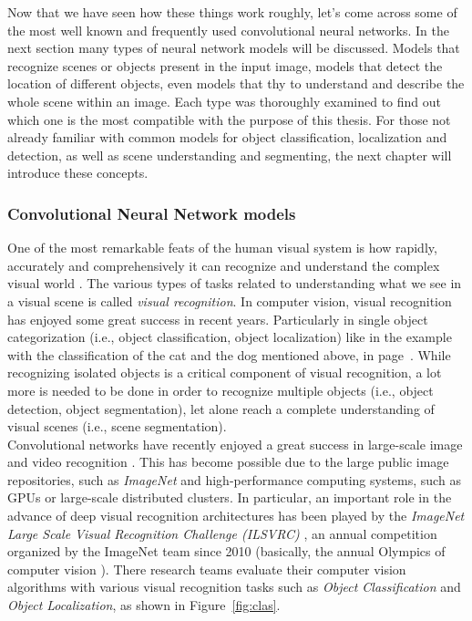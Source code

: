 \documentclass[12pt,a4paper,table,dvipsnames,tikz]{report}
\newcommand{\term}{\textit}
\newcommand{\acronym}{\MakeUppercase}
\newcommand{\bl}[1]{{\hypersetup{linkcolor=blue}#1}}
\begin{document}
	Now that we have seen how these things work roughly, let's come across some of 
	the most well known and frequently used convolutional neural networks. In the 
	next section many types of neural network models will be discussed. Models that 
	recognize scenes or objects present in the input image, models that detect the 
	location of different objects, even models that thy to understand and describe 
	the whole scene within an image. Each type was thoroughly examined to find out 
	which one is the most compatible with the purpose of this thesis. For those 
	not already familiar with common models for object classification, localization 
	and detection, as well as scene understanding and segmenting, the next chapter 
	will introduce these concepts.
	\\
	
	
	\subsubsection{Convolutional Neural Network models}
	\label{sec:bg:data:neural:models}
	
	One of the most remarkable feats of the human visual system is how rapidly, 
	accurately and comprehensively it can recognize and understand the complex visual 
	world \citep{Socher}. The various types of tasks related to understanding what 
	we see in a visual scene is called \term{visual recognition}. In computer vision, 
	visual recognition has enjoyed some great success in recent years. Particularly 
	in single object categorization (i.e., object classification, object localization) 
	like in the example with the classification of the cat and the dog mentioned above, 
	in page~\pageref{eg:cat_dog}. 
	While recognizing isolated objects is a critical component of visual recognition, 
	a lot more is needed to be done in order to recognize multiple objects (i.e., 
	object detection, object segmentation), let alone reach a complete understanding 
	of visual scenes (i.e., scene segmentation).
	\\
	
	Convolutional networks have recently enjoyed a great success in large-scale image 
	and video recognition \citep{Simonyan_vgg}. This has become possible due to the large 
	public image repositories, such as \term{ImageNet} \citep{Deng} and high-performance 
	computing systems, such as \acronym{gpu}s or large-scale distributed clusters. In 
	particular, an important role in the advance of deep visual recognition architectures 
	has been played by the \term{ImageNet Large Scale Visual Recognition Challenge 
	(\acronym{ilsvrc})} \citep{Russakovsky}, an annual competition organized by the 
	ImageNet team since 2010 (basically, the annual Olympics of computer vision \citep{Deshpande}). 
	There research teams evaluate their computer vision algorithms with various visual 
	recognition tasks such as \term{Object Classification} and \term{Object Localization}, 
	as shown in Figure~\bl{\ref{fig:clas}}.
	\\
	
\end{document}
